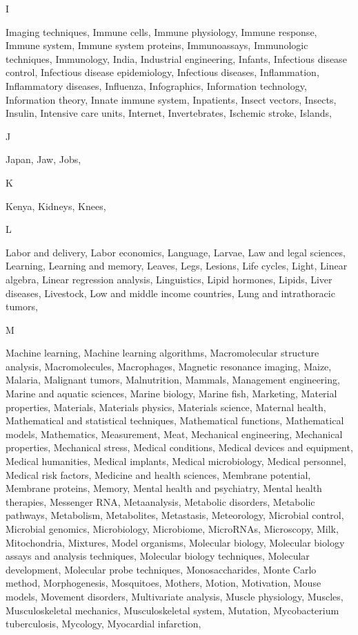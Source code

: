I

Imaging techniques, Immune cells, Immune physiology, Immune response, Immune system, Immune system proteins, Immunoassays, Immunologic techniques, Immunology, India, Industrial engineering, Infants, Infectious disease control, Infectious disease epidemiology, Infectious diseases, Inflammation, Inflammatory diseases, Influenza, Infographics, Information technology, Information theory, Innate immune system, Inpatients, Insect vectors, Insects, Insulin, Intensive care units, Internet, Invertebrates, Ischemic stroke, Islands, 

J

Japan, Jaw, Jobs, 

K

Kenya, Kidneys, Knees, 

L

Labor and delivery, Labor economics, Language, Larvae, Law and legal sciences, Learning, Learning and memory, Leaves, Legs, Lesions, Life cycles, Light, Linear algebra, Linear regression analysis, Linguistics, Lipid hormones, Lipids, Liver diseases, Livestock, Low and middle income countries, Lung and intrathoracic tumors, 

M

Machine learning, Machine learning algorithms, Macromolecular structure analysis, Macromolecules, Macrophages, Magnetic resonance imaging, Maize, Malaria, Malignant tumors, Malnutrition, Mammals, Management engineering, Marine and aquatic sciences, Marine biology, Marine fish, Marketing, Material properties, Materials, Materials physics, Materials science, Maternal health, Mathematical and statistical techniques, Mathematical functions, Mathematical models, Mathematics, Measurement, Meat, Mechanical engineering, Mechanical properties, Mechanical stress, Medical conditions, Medical devices and equipment, Medical humanities, Medical implants, Medical microbiology, Medical personnel, Medical risk factors, Medicine and health sciences, Membrane potential, Membrane proteins, Memory, Mental health and psychiatry, Mental health therapies, Messenger RNA, Metaanalysis, Metabolic disorders, Metabolic pathways, Metabolism, Metabolites, Metastasis, Meteorology, Microbial control, Microbial genomics, Microbiology, Microbiome, MicroRNAs, Microscopy, Milk, Mitochondria, Mixtures, Model organisms, Molecular biology, Molecular biology assays and analysis techniques, Molecular biology techniques, Molecular development, Molecular probe techniques, Monosaccharides, Monte Carlo method, Morphogenesis, Mosquitoes, Mothers, Motion, Motivation, Mouse models, Movement disorders, Multivariate analysis, Muscle physiology, Muscles, Musculoskeletal mechanics, Musculoskeletal system, Mutation, Mycobacterium tuberculosis, Mycology, Myocardial infarction, 

